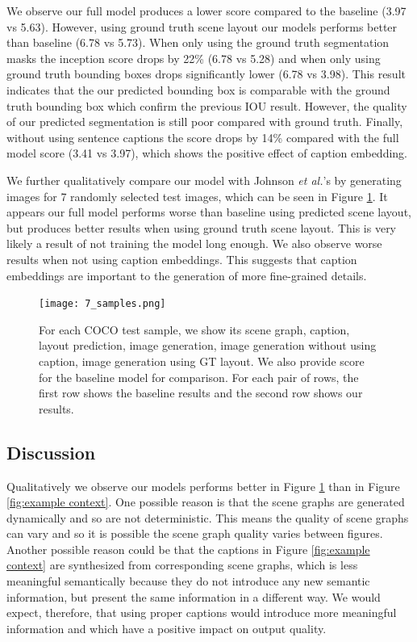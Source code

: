 \documentclass{article}
\begin{document}
We observe our full model produces a lower score compared to the baseline (3.97 vs 5.63). However, using ground truth scene layout our models performs better than baseline (6.78 vs 5.73). When only using the ground truth segmentation masks the inception score drops by 22\% (6.78 vs 5.28) and when only using ground truth bounding boxes drops significantly lower (6.78 vs 3.98). This result indicates that the our predicted bounding box is comparable with the ground truth bounding box which confirm the previous IOU result. However, the quality of our predicted segmentation is still poor compared with ground truth. Finally, without using sentence captions the score drops by 14\% compared with the full model score (3.41 vs 3.97), which shows the positive effect of caption embedding.

We further qualitatively compare our model with Johnson \textit{et al.}'s by generating images for 7 randomly selected test images, which can be seen in Figure \ref{fig:Ablation}. It appears our full model performs worse than baseline using predicted scene layout, but produces better results when using ground truth scene layout. This is very likely a result of not training the model long enough. We also observe worse results when not using caption embeddings. This suggests that caption embeddings are important to the generation of more fine-grained details.

\begin{figure}
    \centering
    \texttt{[image: 7\_samples.png]}
    \caption{For each COCO test sample, we show its scene graph, caption, layout prediction, image generation, image generation without using caption, image generation using GT layout. We also provide score for the baseline model for comparison. For each pair of rows, the first row shows the baseline results and the second row shows our results.}
    \label{fig:Ablation}
\end{figure}
\subsection{Discussion}
Qualitatively we observe our models performs better in Figure \ref{fig:Ablation} than in Figure \ref{fig:example context}. One possible reason is that the scene graphs are generated dynamically and so are not deterministic. This means the quality of scene graphs can vary and so it is possible the scene graph quality varies between figures. Another possible reason could be that the captions in Figure \ref{fig:example context} are synthesized from corresponding scene graphs, which is less meaningful semantically because they do not introduce any new semantic information, but present the same information in a different way. We would expect, therefore, that using proper captions would introduce more meaningful information and which have a positive impact on output quality.
\end{document}
